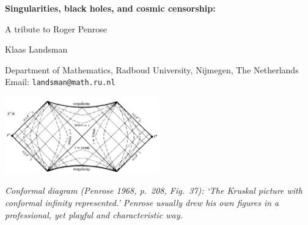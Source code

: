 \documentclass[11pt,a4paper]{article}
\newcommand{\pde}{\textsc{pde}}
\begin{document}
 \setlength{\unitlength}{1cm}\cleardoublepage
\date\nodate
\begin{center}
\begin{LARGE}
{\bf Singularities, black holes, and cosmic censorship: \smallskip

A tribute to Roger Penrose}\end{LARGE}
\bigskip

\begin{Large}
 Klaas Landsman
 \end{Large}
 \medskip
 
 \begin{large}
  Department of Mathematics, Radboud University, Nijmegen, The Netherlands\\
Email:
\texttt{landsman@math.ru.nl}
\end{large}
\smallskip
 \begin{abstract} 
\noindent 
In the light of his recent (and fully deserved) Nobel Prize, this pedagogical paper draws attention to a fundamental tension that drove Penrose's work on general relativity. His 1965 singularity theorem (for which he got the prize) does not in fact imply the existence of black holes (even if its assumptions are met). Similarly, his versatile definition of a singular space-time does not match the generally accepted definition of a black hole (derived from his concept of null infinity). To overcome this, Penrose launched his cosmic censorship conjecture(s), whose evolution we discuss. In particular, we review both his own (mature) formulation and its later, inequivalent reformulation in the \pde\ literature. As a compromise, one might say that  in ``generic'' or ``physically reasonable'' space-times, weak cosmic censorship postulates the \emph{appearance and stability of event horizons}, whereas  strong cosmic censorship asks for the \emph{instability and ensuing disappearance of Cauchy horizons}.
As an \emph{encore}, an appendix by Erik Curiel  reviews the early history of the \emph{definition} of a black hole.
\end{abstract}\end{center}
\tableofcontents

 \begin{center}
\includegraphics[width=0.5\textwidth]{PD1968.png} 
\end{center}
\emph{Conformal diagram (Penrose 1968, p.\ 208, Fig.\ 37): `The Kruskal picture with conformal infinity represented.'
Penrose usually drew his own figures in a  professional, yet playful and characteristic way. }
\end{document}
